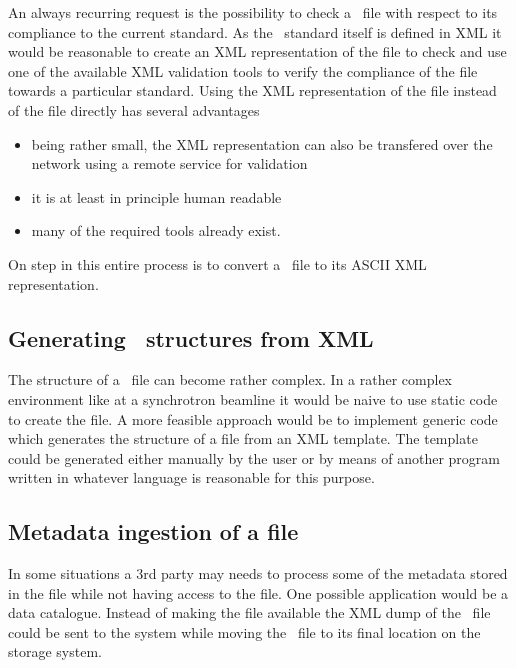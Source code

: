 An always recurring request is the possibility to check a \nexus\ file with
respect to its compliance to the current standard. As the \nexus\ standard 
itself is defined in XML it would be reasonable to create an XML representation
of the file to check and use one of the available XML validation tools to 
verify the compliance of the file towards a particular standard. 
Using the XML representation of the file instead of the file directly has 
several advantages 
\begin{itemize}
\item being rather small, the XML representation can also be transfered 
over the network using a remote service for validation
\item it is at least in principle human readable 
\item many of the required tools already exist. 
\end{itemize}
On step in this entire process is to convert a \nexus\ file to its ASCII XML 
representation.

\subsection{Generating \nexus\ structures from XML}

The structure of a \nexus\ file can become rather complex. In a rather complex 
environment like at a synchrotron beamline it would be naive to use static 
code to create the file. A more feasible approach would be to implement 
generic code which generates the structure of a file from an XML template. 
The template could be generated either manually by the user or by means 
of another program written in whatever language is reasonable for this purpose. 

\subsection{Metadata ingestion of a file}

In some situations a $3$rd party may needs to process some of the metadata 
stored in the file while not having access to the file. One possible application
would be a data catalogue. Instead of making the file available the XML dump 
of the \nexus\ file could be sent to the system while moving the \nexus\ file 
to its final location on the storage system.

